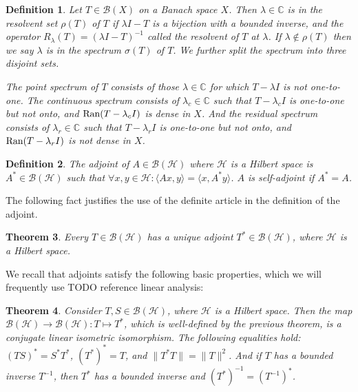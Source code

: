 \documentclass[12pt,oneside]{report}
\newtheorem{thm}{Theorem}[chapter]
\newtheorem{defn}[thm]{Definition}
\begin{document}
\begin{defn}
    Let $T \in \mathscr{B}(X)$ on a Banach space $X$. Then $\lambda \in \mathbb{C}$ is in the resolvent set $\rho(T)$ of $T$ if $\lambda I - T$ is a bijection with a bounded inverse, and the operator $R_{\lambda}(T) = (\lambda I - T)^{-1}$ called the resolvent of $T$ at $\lambda$. If $\lambda \notin \rho(T)$ then we say $\lambda$ is in the spectrum $\sigma(T)$ of $T$. We further split the spectrum into three disjoint sets.
    
    The point spectrum of $T$ consists of those $\lambda \in \mathbb{C}$ for which $T - \lambda I$ is not one-to-one. The continuous spectrum consists of $\lambda_{c} \in \mathbb{C}$ such that $T - \lambda_{c} I$ is one-to-one but not onto, and $\mathrm{Ran}(T - \lambda_{c}I)$ is dense in $X$. And the residual spectrum consists of $\lambda_{r} \in \mathbb{C}$ such that $T - \lambda_{r}I$ is one-to-one but not onto, and $\mathrm{Ran}(T - \lambda_{r}I)$ is not dense in $X$.
\end{defn}

\begin{defn}
    The adjoint of $A \in \mathscr{B}(\mathscr{H})$ where $\mathscr{H}$ is a Hilbert space is $A^{*} \in \mathscr{B}(\mathscr{H})$ such that $\forall x,y \in \mathscr{H}: \langle Ax,y\rangle = \langle x, A^{*}y \rangle$. $A$ is self-adjoint if $A^{*} = A$.
\end{defn}

The following fact justifies the use of the definite article in the definition of the adjoint.

\begin{thm}
    Every $T \in \mathscr{B}(\mathscr{H})$ has a unique adjoint $T^{*} \in \mathscr{B}(\mathscr{H})$, where $\mathscr{H}$ is a Hilbert space.
\end{thm}

We recall that adjoints satisfy the following basic properties, which we will frequently use TODO reference linear analysis:

\begin{thm}\label{adjoint-basic-properties}
    Consider $T, S \in \mathscr{B}(\mathscr{H})$, where $\mathscr{H}$ is a Hilbert space. Then the map $\mathscr{B}(\mathscr{H}) \to \mathscr{B}(\mathscr{H}): T \mapsto T^{*}$, which is well-defined by the previous theorem, is a conjugate linear isometric isomorphism. The following equalities hold: $(TS)^{*} = S^{*}T^{*}$, $(T^{*})^{*} = T$, and $\|T^{*}T\| = \|T\|^{2}$. And if $T$ has a bounded inverse $T^{-1}$, then $T^{*}$ has a bounded inverse and $(T^{*})^{-1} = (T^{-1})^{*}$.
\end{thm}
\end{document}
